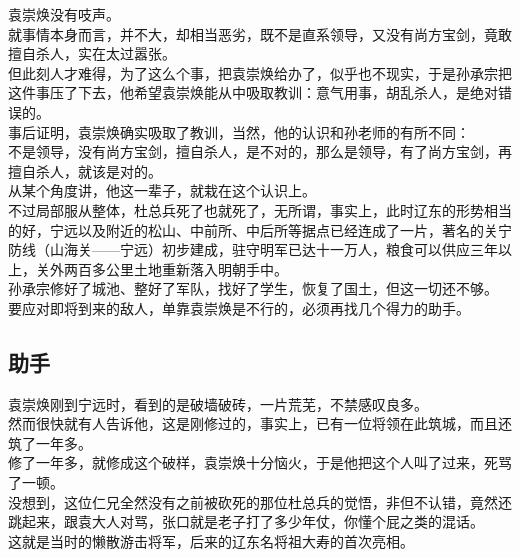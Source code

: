 \begin{multicols}{\theparacolNo}
袁崇焕没有吱声。\\

就事情本身而言，并不大，却相当恶劣，既不是直系领导，又没有尚方宝剑，竟敢擅自杀人，实在太过嚣张。\\

但此刻人才难得，为了这么个事，把袁崇焕给办了，似乎也不现实，于是孙承宗把这件事压了下去，他希望袁崇焕能从中吸取教训：意气用事，胡乱杀人，是绝对错误的。\\

事后证明，袁崇焕确实吸取了教训，当然，他的认识和孙老师的有所不同：\\

不是领导，没有尚方宝剑，擅自杀人，是不对的，那么是领导，有了尚方宝剑，再擅自杀人，就该是对的。\\

从某个角度讲，他这一辈子，就栽在这个认识上。\\

不过局部服从整体，杜总兵死了也就死了，无所谓，事实上，此时辽东的形势相当的好，宁远以及附近的松山、中前所、中后所等据点已经连成了一片，著名的关宁防线（山海关——宁远）初步建成，驻守明军已达十一万人，粮食可以供应三年以上，关外两百多公里土地重新落入明朝手中。\\

孙承宗修好了城池、整好了军队，找好了学生，恢复了国土，但这一切还不够。\\

要应对即将到来的敌人，单靠袁崇焕是不行的，必须再找几个得力的助手。\\

\subsection{助手}
袁崇焕刚到宁远时，看到的是破墙破砖，一片荒芜，不禁感叹良多。\\

然而很快就有人告诉他，这是刚修过的，事实上，已有一位将领在此筑城，而且还筑了一年多。\\

修了一年多，就修成这个破样，袁崇焕十分恼火，于是他把这个人叫了过来，死骂了一顿。\\

没想到，这位仁兄全然没有之前被砍死的那位杜总兵的觉悟，非但不认错，竟然还跳起来，跟袁大人对骂，张口就是老子打了多少年仗，你懂个屁之类的混话。\\

这就是当时的懒散游击将军，后来的辽东名将祖大寿的首次亮相。\\


\end{multicols}
